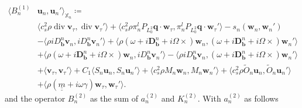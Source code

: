 \documentclass{m2an}
\newcommand{\csr}{c_s^2 \rho}
\newcommand{\bflow}{\mathbf{b}}
\newcommand{\angvel}{\Omega}
\newcommand{\dopd}{(\omega+i\ddiffb+i\angvel\times)}
\newcommand{\dopdSmall}{(\omega\!+\!i\ddiffb\!\!+\!i\angvel\times)}
\renewcommand{\u}{\mathbf{u}}
\renewcommand{\v}{\mathbf{v}}
\newcommand{\w}{\mathbf{w}}
\newcommand{\q}{\mathbf{q}} %
\renewcommand{\div}{\operatorname{div}}
\newcommand{\Xn}{\mathbb{X}_n}
\newcommand{\bD}{\mathbf{D}}
\newcommand{\spl}{\langle}
\newcommand{\spr}{\rangle}
\newcommand{\ddiffb}{\bD_{\bflow}^n}
\newcommand{\matii}{\underline{\underline{m}}}
\newcommand{\Sol}{S_n}
\newcommand{\BnI}{B_n^{(1)}}
\newcommand{\BnII}{B_n^{(2)}}
\newcommand{\KnII}{K_n^{(2)}}
\newcommand{\anII}{a_n^{(2)}}
\theoremstyle{plain}
\theoremstyle{definition}
\begin{document}
\begin{subequations}\label{eq:appendix:BnI}
   \begin{align}
      \spl \BnI &\u_n, \u_n' \spr_{\Xn} \coloneqq \nonumber \\ 
         &\spl c_s^2 \rho \div \v_{\tau}, \div \v_{\tau}' \spr + \spl c^2_s \rho \pi_n^l P_{L^2_0} \q \cdot \w_{\tau}, \pi_n^l P_{L^2_0} \q \cdot \w_{\tau}' \spr - s_n(\w_n,\w_n') \\
         &- \spl \rho i D^n_{\bflow} \v_n, i D^n_{\bflow} \v_n' \spr + \spl \rho \dopdSmall \w_n, \dopdSmall \w_n' \spr \\
         &+ \spl \rho \dopdSmall \w_n, i D^n_{\bflow} \v_n' \spr - \spl \rho i D^n_{\bflow} \v_n, \dopd \w_n' \spr \\
         &+ \spl \v_{\tau}, \v_{\tau}' \spr \! + \! C_1 \spl \Sol \u_n, \Sol \u_n' \spr \! + \! \spl \csr M_n \w_{n}, M_n \w_{n}' \spr \!  + \! \spl \csr \tilde{O}_n \u_n, \tilde{O}_n \u_n' \spr \\
         &+ \spl \rho (\matii + i \omega \gamma) \w_{\tau}, \w_{\tau}' \spr. 
   \end{align}
\end{subequations} 
and the operator $\BnII$ as the sum of $\anII$ and $\KnII$.
With $\anII$ as follows
\end{document}
